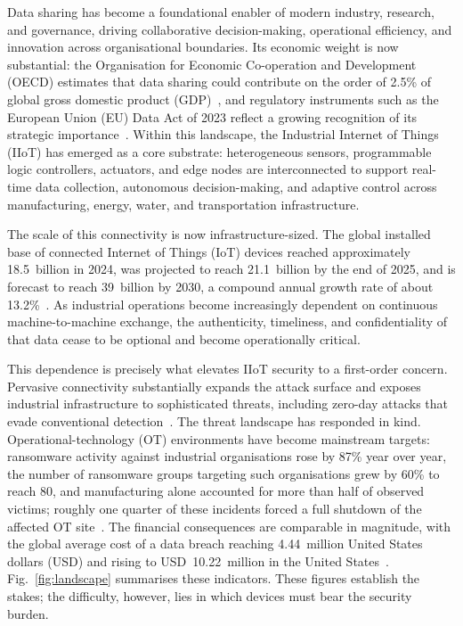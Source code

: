 \Large
\label{Chapter_1}

Data sharing has become a foundational enabler of modern industry, research, and
governance, driving collaborative decision-making, operational efficiency, and
innovation across organisational boundaries. Its economic weight is now
substantial: the Organisation for Economic Co-operation and Development (OECD)
estimates that data sharing could contribute on the order of 2.5\% of global
gross domestic product (GDP)~\cite{oecd2019data}, and regulatory instruments
such as the European Union (EU) Data Act of 2023 reflect a growing recognition
of its strategic importance~\cite{eu2023dataact}.
Within this landscape, the Industrial Internet of Things (IIoT) has emerged as a
core substrate: heterogeneous sensors, programmable logic controllers,
actuators, and edge nodes are interconnected to support real-time data
collection, autonomous decision-making, and adaptive control across
manufacturing, energy, water, and transportation infrastructure.
 
The scale of this connectivity is now infrastructure-sized. The global installed
base of connected Internet of Things (IoT) devices reached approximately
18.5~billion in 2024, was projected to reach 21.1~billion by the end of 2025,
and is forecast to reach 39~billion by 2030, a compound annual growth rate of
about 13.2\%~\cite{iotanalytics2025}. As
industrial operations become increasingly dependent on continuous
machine-to-machine exchange, the authenticity, timeliness, and confidentiality
of that data cease to be optional and become operationally critical.
 
This dependence is precisely what elevates IIoT security to a first-order
concern. Pervasive connectivity substantially expands the attack surface and
exposes industrial infrastructure to sophisticated threats, including zero-day
attacks that evade conventional detection~\cite{amadi2026lightweight}. The threat
landscape has responded in kind. Operational-technology (OT) environments have
become mainstream targets: ransomware activity against industrial organisations
rose by 87\% year over year, the number of ransomware groups targeting
such organisations grew by 60\% to reach 80, and manufacturing alone accounted
for more than half of observed victims; roughly one quarter of these incidents
forced a full shutdown of the affected OT site~\cite{dragos2025}. The financial
consequences are comparable in magnitude, with the global average cost of a data
breach reaching 4.44~million United States dollars (USD) and rising to
USD~10.22~million in the United States~\cite{ibm2025}.
Fig.~\ref{fig:landscape} summarises these indicators.
These figures establish the stakes; the difficulty, however, lies in which
devices must bear the security burden.

